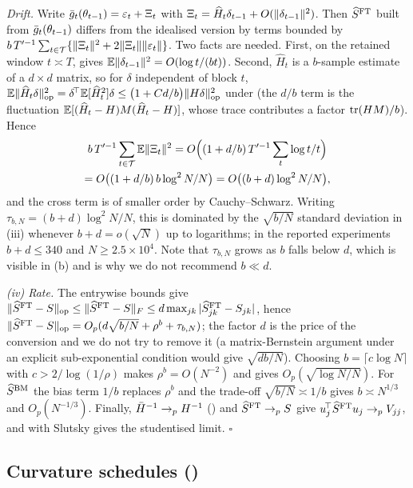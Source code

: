 \emph{Drift.} Write $\bar{g}_t(\theta_{t-1})=\varepsilon_t+\Xi_t$ with
$\Xi_t=\widehat H_t\delta_{t-1}+O(\lVert \delta_{t-1} \rVert^2)$. Then
$\widehat{S}^{\mathrm{FT}}$ built from $\bar{g}_t(\theta_{t-1})$ differs from the idealised version by terms bounded
by $b\,T'^{-1}\sum_{t\in\mathcal T}\{\lVert \Xi_t \rVert^2+2\lVert \Xi_t \rVert\lVert \varepsilon_t \rVert\}$.
Two facts are needed. First, on the retained window $t\asymp T$,  gives
$\mathbb{E}\lVert \delta_{t-1} \rVert^2=O(\log t/(bt))$. Second, $\widehat H_t$ is a $b$-sample estimate of
a $d\times d$ matrix, so for $\delta$ independent of block $t$,
$\mathbb{E}\lVert \widehat H_t\delta \rVert_{\mathrm{op}}^2
=\delta^{\!\top}\mathbb{E}[\widehat H_t^2]\delta
\le\big(1+C d/b\big)\lVert H\delta \rVert_{\mathrm{op}}^2$
under  (the $d/b$ term is the fluctuation
$\mathbb{E}[(\widehat H_t-H)M(\widehat H_t-H)]$, whose trace contributes a factor $\operatorname{tr}(HM)/b$).
Hence
\begin{multline*}
b\,T'^{-1}\sum_{t\in\mathcal T}\mathbb{E}\lVert \Xi_t \rVert^2
=O\Big((1+d/b)\,T'^{-1}\sum_{t}\log t/t\Big)\\
=O\big((1+d/b)\,b\log^2 N/N\big)
=O\big((b+d)\log^2N/N\big),
\end{multline*}
and the cross term is of smaller order by Cauchy--Schwarz. Writing
$\tau_{b,N}=(b+d)\log^2N/N$, this is dominated by the $\sqrt{b/N}$ standard deviation in
(iii) whenever $b+d=o(\sqrt N)$ up to logarithms; in the reported experiments
$b+d\le 340$ and $N\ge2.5\times10^4$. Note that $\tau_{b,N}$ grows as $b$ falls below $d$,
which is visible in (b) and is why we do not recommend $b\ll d$.

\emph{(iv) Rate.} The entrywise bounds give
$\lVert \widehat{S}^{\mathrm{FT}}-S \rVert_{\mathrm{op}}\le\lVert \widehat{S}^{\mathrm{FT}}-S \rVert_F\le d\max_{jk}|\widehat{S}^{\mathrm{FT}}_{jk}-S_{jk}|$, hence
$\lVert \widehat{S}^{\mathrm{FT}}-S \rVert_{\mathrm{op}}=O_p(d\sqrt{b/N}+\rho^b+\tau_{b,N})$; the factor $d$ is the price of the
conversion and we do not try to remove it (a matrix-Bernstein argument under an explicit
sub-exponential condition would give $\sqrt{db/N}$).
Choosing $b=\lceil c\log N\rceil$ with $c>2/\log(1/\rho)$ makes $\rho^{b}=O(N^{-2})$ and
gives $O_p(\sqrt{\log N/N})$. For $\widehat{S}^{\mathrm{BM}}$ the bias term $1/b$ replaces $\rho^b$ and the
trade-off $\sqrt{b/N}\asymp1/b$ gives $b\asymp N^{1/3}$ and $O_p(N^{-1/3})$.
Finally, $\bar{H}^{-1}\to_pH^{-1}$ () and $\widehat{S}^{\mathrm{FT}}\to_pS$ give
$u_j^{\!\top}\widehat{S}^{\mathrm{FT}} u_j\to_p V_{jj}$, and  with Slutsky gives the
studentised limit. \hfill$\square$

\subsection{Curvature schedules (\texorpdfstring{}{Proposition})}


